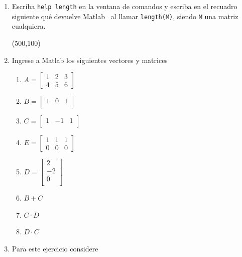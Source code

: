 \documentclass[letter,11pt]{article}
\newcommand\0{\mathbf{0}}
\newcommand{\matlab}{{\sc Matlab }}
\begin{document}
\begin{enumerate}
\item	Escriba \texttt{help length} en la ventana de comandos y escriba en el recuadro siguiente qu\'e   devuelve \matlab\, al llamar \texttt{length(M)}, siendo \texttt{M} una   matriz cualquiera.

\framebox(500,100){}

\item Ingrese a \matlab los siguientes vectores y matrices
\begin{multicols}{4}
\begin{enumerate}
	\item 
    $A=\begin{bmatrix}
    1 & 2 & 3 \\
    4 & 5 & 6
	\end{bmatrix}$

	\item 
    $B=\begin{bmatrix}
    1 & 0 &1 \\
	\end{bmatrix}$
    
    \item 
    $C=\begin{bmatrix}
    1&-1&1 \\
	\end{bmatrix}$
    
        \item 
    $E=\begin{bmatrix}
    1&1&1 \\ 0 & 0 & 0 
	\end{bmatrix}$
    
        \item 
    $D=\begin{bmatrix}
    2\\-2\\0 \\
	\end{bmatrix}$
    
    \item $B+C$

	\item $C\cdot D$
    
    \item $D \cdot C$
\end{enumerate}
\end{multicols}

\item Para este ejercicio considere


\end{enumerate}
\end{document}
